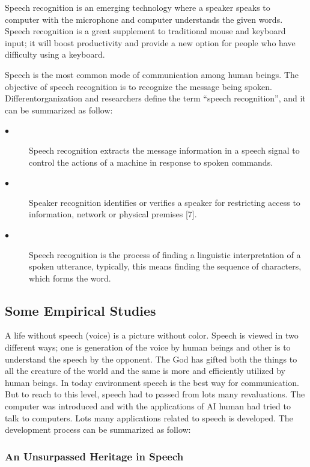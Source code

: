 \documentclass[12pt,a4paper,oneside]{memoir}
\begin{document}
Speech recognition is an emerging technology where a speaker speaks to computer
with the microphone and computer understands the given words. Speech recognition
is a great supplement to traditional mouse and keyboard input; it will boost
productivity and provide a new option for people who have difficulty using a
keyboard.

Speech is the most common mode of communication among human beings. The
objective of speech recognition is to recognize the message being spoken. Differentorganization and researchers define the term “speech recognition”, and it can be summarized as follow:
\begin{description}
\item[$\bullet$] Speech recognition extracts the message information in a speech signal to control the
actions of a machine in response to spoken commands.
\item[$\bullet$]Speaker recognition identifies or verifies a speaker for restricting access to
information, network or physical premises [7].
\item[$\bullet$]Speech recognition is the process of finding a linguistic interpretation of a spoken
utterance, typically, this means finding the sequence of characters, which forms the
word.
\end{description}

\subsection{Some Empirical Studies}
A life without speech (voice) is a picture without color. Speech is viewed in two
different ways; one is generation of the voice by human beings and other is to
understand the speech by the opponent. The God has gifted both the things to all the
creature of the world and the same is more and efficiently utilized by human beings.
In today environment speech is the best way for communication. But to reach to this
level, speech had to passed from lots many revaluations. The computer was
introduced and with the applications of AI human had tried to talk to computers. Lots
many applications related to speech is developed. The development process can be
summarized as follow:

\subsubsection{An Unsurpassed Heritage in Speech}
\end{document}

